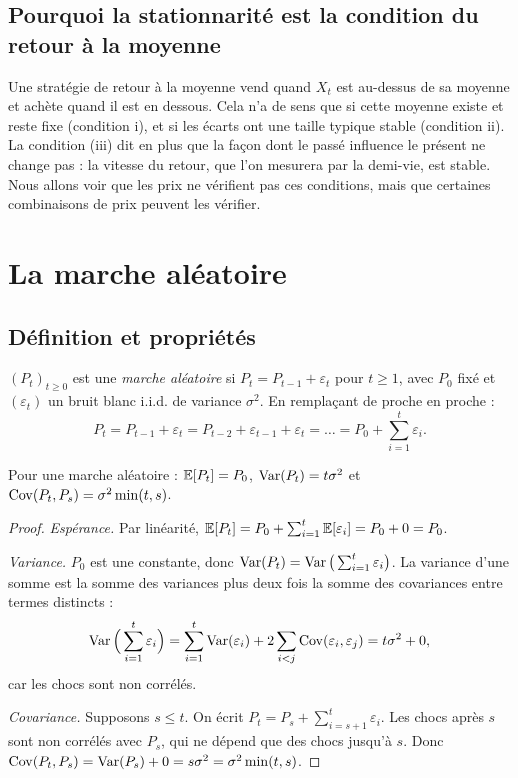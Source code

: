 \subsection{Pourquoi la stationnarité est la condition du retour à la moyenne}

Une stratégie de retour à la moyenne vend quand $X_t$ est \og au-dessus de sa moyenne\fg{} et achète quand il est en dessous. Cela n'a de sens que si cette moyenne existe et reste fixe (condition i), et si les écarts ont une taille typique stable (condition ii). La condition (iii) dit en plus que la façon dont le passé influence le présent ne change pas : la \og vitesse\fg{} du retour, que l'on mesurera par la demi-vie, est stable. Nous allons voir que les prix ne vérifient pas ces conditions, mais que certaines combinaisons de prix peuvent les vérifier.

\section{La marche aléatoire}

\subsection{Définition et propriétés}

\begin{definition}
$(P_t)_{t\ge0}$ est une \emph{marche aléatoire} si $P_t = P_{t-1} + \varepsilon_t$ pour $t \ge 1$, avec $P_0$ fixé et $(\varepsilon_t)$ un bruit blanc i.i.d. de variance $\sigma^2$. En remplaçant de proche en proche :
\[
P_t = P_{t-1} + \varepsilon_t = P_{t-2} + \varepsilon_{t-1} + \varepsilon_t = \dots = P_0 + \sum_{i=1}^{t}\varepsilon_i.
\]
\end{definition}

\begin{proposition}\label{c1:prop:rw}
Pour une marche aléatoire : $\mathbb{E}[P_t] = P_0$, $\operatorname{Var}(P_t) = t\sigma^2$ et $\operatorname{Cov}(P_t,P_s) = \sigma^2\min(t,s)$.
\end{proposition}
\begin{proof}
\emph{Espérance.} Par linéarité, $\mathbb{E}[P_t] = P_0 + \sum_{i=1}^t \mathbb{E}[\varepsilon_i] = P_0 + 0 = P_0$.

\emph{Variance.} $P_0$ est une constante, donc $\operatorname{Var}(P_t) = \operatorname{Var}\big(\sum_{i=1}^t\varepsilon_i\big)$. La variance d'une somme est la somme des variances plus deux fois la somme des covariances entre termes distincts :
\[
\operatorname{Var}\Big(\sum_{i=1}^t\varepsilon_i\Big) = \sum_{i=1}^t\operatorname{Var}(\varepsilon_i) + 2\sum_{i<j}\operatorname{Cov}(\varepsilon_i,\varepsilon_j) = t\sigma^2 + 0,
\]
car les chocs sont non corrélés.

\emph{Covariance.} Supposons $s \le t$. On écrit $P_t = P_s + \sum_{i=s+1}^t\varepsilon_i$. Les chocs après $s$ sont non corrélés avec $P_s$, qui ne dépend que des chocs jusqu'à $s$. Donc $\operatorname{Cov}(P_t,P_s) = \operatorname{Var}(P_s) + 0 = s\sigma^2 = \sigma^2\min(t,s)$.
\end{proof}

